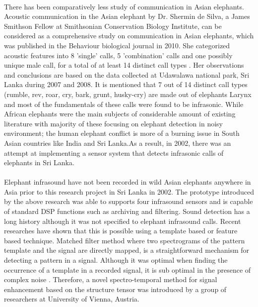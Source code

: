 \documentclass[11pt]{article}
\numberwithin{figure}{section}
\numberwithin{table}{section}
\begin{document}
\paragraph{}
There has been comparatively less study of communication in Asian elephants. Acoustic communication in the Asian elephant by Dr. Shermin de Silva, a  James Smithson Fellow at Smithsonian Conservation Biology Institute, can be considered as a comprehensive study on communication in Asian elephants, which was published in the Behaviour biological journal in 2010. She categorized acoustic features into 8 'single' calls, 5 'combination' calls and one possibly unique male call, for a total of at least 14 distinct call types \cite {19}. Her observations and conclusions are based on the data collected at Udawalawa national park, Sri Lanka during 2007 and 2008. It is mentioned that 7 out of 14 distinct call types (rumble, rev, roar, cry, bark, grunt, husky-cry) are made out of elephants Larynx and most of the fundamentals of these calls were found to be infrasonic. While African elephants were the main subjects of considerable amount of existing literature with majority of these focusing on elephant detection in noisy environment; the human elephant conflict is more of a burning issue in South Asian countries like India and Sri Lanka.As a result, in 2002, there was an attempt at implementing a sensor system that detects infrasonic calls of elephants in Sri Lanka.

\paragraph{}
Elephant infrasound have not been recorded in wild Asian elephants anywhere in Asia prior to this research project in Sri Lanka in 2002. The prototype introduced by the above research was able to supports four infrasound sensors and is capable of standard DSP functions such as archiving and filtering. Sound detection has a long history although it was not specified to elephant infrasound calls. Recent researches have shown that this is possible using a template based or feature based technique. Matched filter method where two spectrograms of the pattern template and the signal are directly mapped, is a straightforward mechanism for detecting a pattern in a signal. Although it was optimal when finding the occurrence of a template in a recorded signal, it is sub optimal in the presence of complex noise \cite {10}. Therefore, a novel spectro-temporal method for signal enhancement based on the structure tensor \cite {11} was introduced by a group of researchers at University of Vienna, Austria. 
\end{document}

